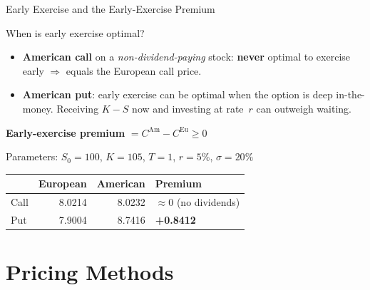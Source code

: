 \documentclass[aspectratio=169,10pt]{beamer}
\newcommand{\highlight}[1]{\textcolor{amred}{\textbf{#1}}}
\begin{document}
\begin{frame}{Early Exercise and the Early-Exercise Premium}
  \begin{block}{When is early exercise optimal?}
    \begin{itemize}
      \item \textbf{American call} on a \emph{non-dividend-paying} stock:
            \highlight{never} optimal to exercise early $\Rightarrow$ equals
            the European call price.
      \item \textbf{American put}: early exercise can be optimal when the
            option is deep in-the-money.  Receiving $K-S$ now and investing
            at rate~$r$ can outweigh waiting.
    \end{itemize}
  \end{block}

  \bigskip
  \textbf{Early-exercise premium} $= C^{\text{Am}} - C^{\text{Eu}} \ge 0$

  \medskip
  Parameters: $S_0=100$, $K=105$, $T=1$, $r=5\%$, $\sigma=20\%$

  \medskip
  \begin{tabular}{lrrl}
    \toprule
    & European & American & Premium \\
    \midrule
    Call & 8.0214 & 8.0232 & $\approx 0$ (no dividends) \\
    Put  & 7.9004 & 8.7416 & \highlight{+0.8412} \\
    \bottomrule
  \end{tabular}
\end{frame}

\section{Pricing Methods}
\end{document}
